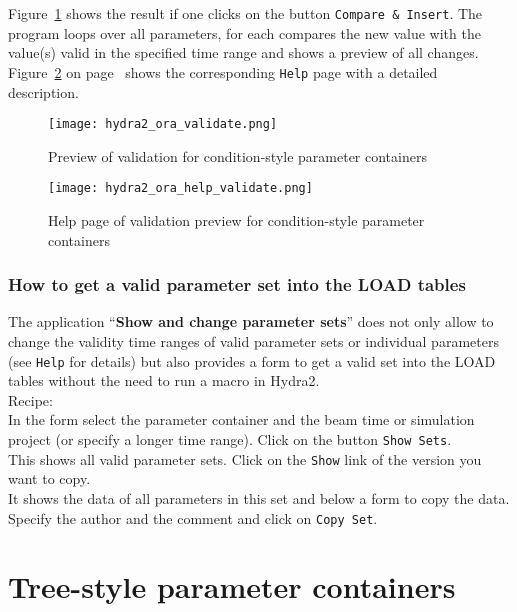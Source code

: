 Figure~\ref{fig:oraValidate} shows the result if one clicks on the button \verb+Compare & Insert+. The program loops over 
all parameters, for each compares the new value with the value(s) valid in the specified time range and shows a preview of 
all changes.\\
Figure~\ref{fig:oraHelpValidate} on page~\pageref{fig:oraHelpValidate} shows the corresponding \verb+Help+ page with a 
detailed description.

\begin{figure}[\htb]
  \centering
  \texttt{[image: hydra2\_ora\_validate.png]}
  \caption[Preview of validation for condition-style parameter containers]
          {Preview of validation for condition-style parameter containers}
  \label{fig:oraValidate}
\end{figure}

\begin{figure}[\htb]
  \centering
  \texttt{[image: hydra2\_ora\_help\_validate.png]}
  \caption[Help page of validation preview for condition-style parameter containers]
          {Help page of validation preview for condition-style parameter containers}
  \label{fig:oraHelpValidate}
\end{figure}

\subsubsection{How to get a valid parameter set into the LOAD tables}

The application ``\textbf{Show and change parameter sets}'' does not only allow to change the validity time ranges of valid 
parameter sets or individual parameters (see \verb+Help+ for details) but also provides a form to get a valid set into 
the LOAD tables without the need to run a macro in Hydra2.\\

Recipe:\\
In the form select the parameter container and the beam time or simulation project (or specify a longer time range). Click 
on the button \verb+Show Sets+.\\
This shows all valid parameter sets. Click on the \verb+Show+ link of the version you want to copy.\\
It shows the data of all parameters in this set and below a form to copy the data. Specify the author and the comment 
and click on \verb+Copy Set+.

\section[Tree-style parameter containers]{Tree-style parameter containers} \label{sec:oraTreeStyle}

